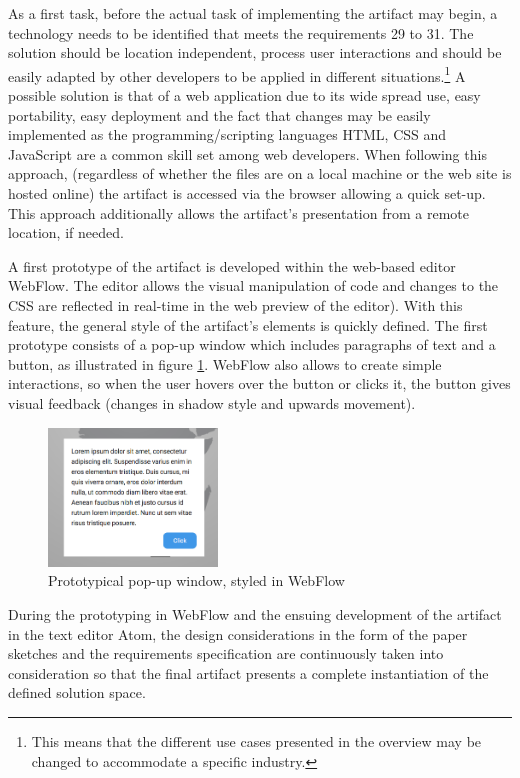 As a first task, before the actual task of implementing the artifact may begin, a technology needs to be identified that meets the requirements 29 to 31. The solution should be location independent, process user interactions and should be easily adapted by other developers to be applied in different situations.\footnote{This means that the different use cases presented in the overview may be changed to accommodate a specific industry.} A possible solution is that of a web application due to its wide spread use, easy portability, easy deployment and the fact that changes may be easily implemented as the programming/scripting languages HTML, CSS and JavaScript are a common skill set among web developers. When following this approach, (regardless of whether the files are on a local machine or the web site is hosted online) the artifact is accessed via the browser allowing a quick set-up. This approach additionally allows the artifact's presentation from a remote location, if needed.

A first prototype of the artifact is developed within the web-based editor WebFlow. The editor allows the visual manipulation of code and changes to the CSS are reflected in real-time in the web preview of the editor). With this feature, the general style of the artifact's elements is quickly defined. The first prototype consists of a pop-up window which includes paragraphs of text and a button, as illustrated in figure \ref{fig:proto1}. WebFlow also allows to create simple interactions, so when the user hovers over the button or clicks it, the button gives visual feedback (changes in shadow style and upwards movement).

\begin{figure}
    \centering
    \includegraphics[width=0.4\textwidth]{latex-vorlage_v1.5/graphics/Prototype1.png}
    \caption{Prototypical pop-up window, styled in WebFlow}
    \label{fig:proto1}
\end{figure}

During the prototyping in WebFlow and the ensuing development of the artifact in the text editor Atom, the design considerations in the form of the paper sketches and the requirements specification are continuously taken into consideration so that the final artifact presents a complete instantiation of the defined solution space.

